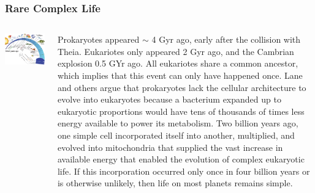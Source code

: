 \begin{frame}
\frametitle{Rare Complex Life}

\begin{columns}

\includegraphics[scale=0.40]{evolutionlife}


Prokaryotes appeared $\sim$ 4 Gyr ago, early after the collision with Theia. Eukariotes only appeared 2 Gyr ago, and the Cambrian explosion 0.5 GYr ago.  
All eukariotes share a common ancestor, which implies that this event can only have happened once. Lane and others argue that prokaryotes lack the cellular architecture to evolve into eukaryotes because a bacterium expanded up to eukaryotic proportions would have tens of thousands of times less energy available to power its metabolism. Two billion years ago, one simple cell incorporated itself into another, multiplied, and evolved into mitochondria that supplied the vast increase in available energy that enabled the evolution of complex eukaryotic life. If this incorporation occurred only once in four billion years or is otherwise unlikely, then life on most planets remains simple.


\end{columns}
\end{frame}

